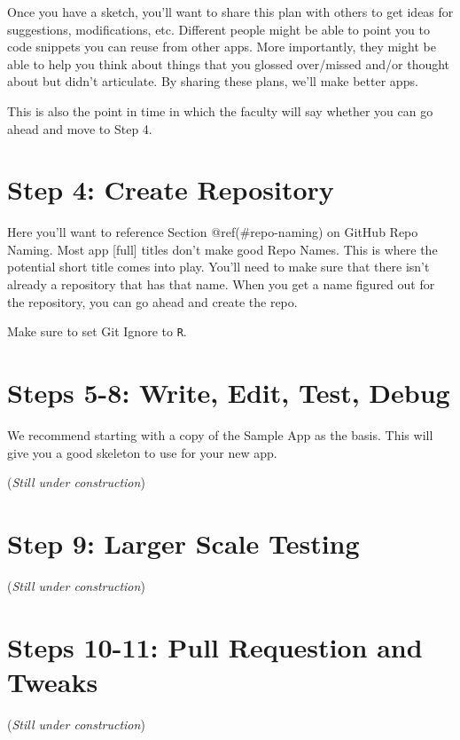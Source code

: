 \documentclass[
]{book}
\begin{document}
Once you have a sketch, you'll want to share this plan with others to get ideas for suggestions, modifications, etc. Different people might be able to point you to code snippets you can reuse from other apps. More importantly, they might be able to help you think about things that you glossed over/missed and/or thought about but didn't articulate. By sharing these plans, we'll make better apps.

This is also the point in time in which the faculty will say whether you can go ahead and move to Step 4.

\hypertarget{step4}{%
\section{Step 4: Create Repository}\label{step4}}

Here you'll want to reference Section @ref(\#repo-naming) on GitHub Repo Naming. Most app {[}full{]} titles don't make good Repo Names. This is where the potential short title comes into play. You'll need to make sure that there isn't already a repository that has that name. When you get a name figured out for the repository, you can go ahead and create the repo.

Make sure to set Git Ignore to \texttt{R}.

\hypertarget{steps5-8}{%
\section{Steps 5-8: Write, Edit, Test, Debug}\label{steps5-8}}

We recommend starting with a copy of the Sample App as the basis. This will give you a good skeleton to use for your new app.

(\emph{Still under construction})

\hypertarget{step9}{%
\section{Step 9: Larger Scale Testing}\label{step9}}

(\emph{Still under construction})

\hypertarget{steps10-11}{%
\section{Steps 10-11: Pull Requestion and Tweaks}\label{steps10-11}}

(\emph{Still under construction})

  
\end{document}
